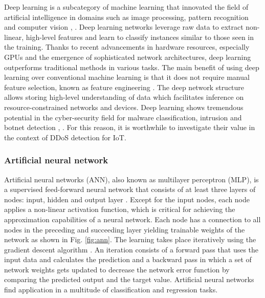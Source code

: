 \documentclass[conference, 11pt]{IEEEtran}
\begin{document}
    Deep learning is a subcategory of machine learning that innovated the field of artificial intelligence in domains such as image processing, pattern recognition and computer vision \cite{article:17}, \cite{Goodfellow-et-al-2016}.
    Deep learning networks leverage raw data to extract non-linear, high-level features and learn to classify instances similar to those seen in the training.
    Thanks to recent advancements in hardware resources, especially GPUs and the emergence of sophisticated network architectures, deep learning outperforms traditional methods in various tasks.
    The main benefit of using deep learning over conventional machine learning is that it does not require manual feature selection, known as feature engineering \cite{Goodfellow-et-al-2016}.
    The deep network structure allows storing high-level understanding of data which facilitates inference on resource-constrained networks and devices.
    Deep learning shows tremendous potential in the cyber-security field for malware classification, intrusion and botnet detection \cite{article:17}, \cite{inproceedings:19}.
    For this reason, it is worthwhile to investigate their value in the context of DDoS detection for IoT.

    \subsubsection{Artificial neural network}
    Artificial neural networks (ANN), also known as multilayer perceptron (MLP), is a supervised feed-forward neural network that consists of at least three layers of nodes: input, hidden and output layer  \cite{Goodfellow-et-al-2016}.
    Except for the input nodes, each node applies a non-linear activation function, which is critical for achieving the approximation capabilities of a neural network.
    Each node has a connection to all nodes in the preceding and succeeding layer yielding trainable weights of the network as shown in Fig. \ref{fig:ann}.
    The learning takes place iteratively using the gradient descent algorithm \cite{AMARI1993185}.
    An iteration consists of a forward pass that uses the input data and calculates the prediction and a backward pass in which a set of network weights gets updated to decrease the network error function by comparing the predicted output and the target value.
    Artificial neural networks find application in a multitude of classification and regression tasks.
\end{document}

